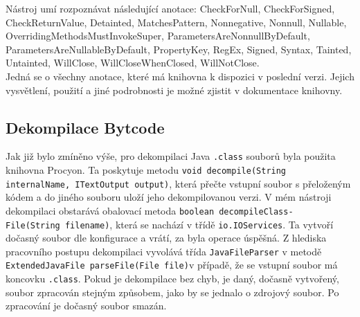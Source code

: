 				Nástroj umí rozpoznávat následující anotace: CheckForNull, CheckForSigned, CheckReturnValue, Detainted, MatchesPattern, Nonnegative, Nonnull, Nullable, OverridingMethodsMustInvokeSuper, ParametersAreNonnullByDefault, ParametersAreNullableByDefault, PropertyKey, RegEx, Signed, Syntax, Tainted, Untainted, WillClose, WillCloseWhenClosed, WillNotClose.\\
				
				Jedná se o všechny anotace, které má knihovna k dispozici v poslední verzi. Jejich vysvětlení, použití a jiné podrobnosti je možné zjistit v dokumentace knihovny.
			
		

		
		\subsection{Dekompilace Bytcode}
			Jak již bylo zmíněno výše, pro dekompilaci Java \texttt{.class} souborů byla použita knihovna Procyon. Ta poskytuje metodu \texttt{void decompile(String internalName, ITextOutput output)}, která přečte vstupní soubor s přeloženým kódem a do jiného souboru uloží jeho dekompilovanou verzi. V mém nástroji dekompilaci obstarává obalovací metoda \texttt{boolean decompileClass-\\File(String filename)}, která se nachází v třídě \texttt{io.IOServices}. Ta vytvoří dočasný soubor dle konfigurace a vrátí, za byla operace úspěšná. Z hlediska pracovního postupu dekompilaci vyvolává třída \texttt{JavaFileParser} v metodě \texttt{ExtendedJavaFile parseFile(File file)}v případě, že se vstupní soubor má koncovku \texttt{.class}. Pokud je dekompilace bez chyb, je daný, dočasně vytvořený, soubor zpracován stejným způsobem, jako by se jednalo o zdrojový soubor. Po zpracování je dočasný soubor smazán.
					

	    


		

